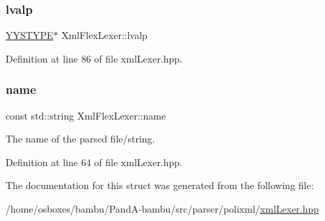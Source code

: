 \subsubsection{\texorpdfstring{lvalp}{lvalp}}
{\footnotesize\ttfamily \hyperlink{asn__parser_8cpp_a2ceb5b985e149f18e018b142cfdd7264}{Y\+Y\+S\+T\+Y\+PE}$\ast$ Xml\+Flex\+Lexer\+::lvalp}



Definition at line 86 of file xml\+Lexer.\+hpp.

\mbox{\label{structXmlFlexLexer_a5bef8cd5715705713c5bd3e27d07eb09}} 
\subsubsection{\texorpdfstring{name}{name}}
{\footnotesize\ttfamily const std\+::string Xml\+Flex\+Lexer\+::name}



The name of the parsed file/string. 



Definition at line 64 of file xml\+Lexer.\+hpp.



The documentation for this struct was generated from the following file\+:\begin{DoxyCompactItemize}
\item 
/home/osboxes/bambu/\+Pand\+A-\/bambu/src/parser/polixml/\hyperlink{xmlLexer_8hpp}{xml\+Lexer.\+hpp}\end{DoxyCompactItemize}
